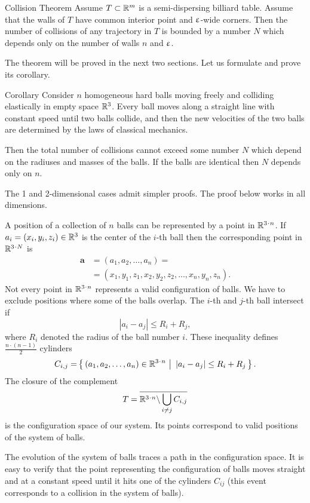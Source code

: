 \begin{thm}{Collision Theorem}\label{thm:collision}
Assume $T\subset\RR^m$
is a semi-dispersing billiard table.
Assume that the walls of $T$ have common interior point and $\upvarepsilon$-wide corners.
Then the number of collisions of any trajectory in  $T$  is bounded
by a number $N$ which depends only on the number of walls $n$ and $\upvarepsilon$.
\end{thm}


The theorem will be proved in the next two sections.
Let us formulate and prove its corollary.

\begin{thm}{Corollary}\label{cor:balls}
Consider $n$ homogeneous hard balls
moving freely and colliding
elastically in empty space $\mathbb{R}^3$. 
Every ball moves
along a straight line with constant speed until two balls collide, and then
the new velocities of the two balls are determined by the
laws of classical mechanics.

Then the total number of collisions cannot exceed some number $N$ which depend on the radiuses and masses of the balls.
If the balls are identical then $N$ depends only on $n$.
\end{thm}

The 1 and 2-dimensional cases admit simpler proofs.
The proof below works in all dimensions.



A position of a collection of $n$ balls can be represented by a point in $\RR^{3\cdot n}$.
If $a_i=(x_i,y_i,z_i) \in \RR^3$ is the center of the $i$-th ball
then
the corresponding point in $\RR^{3\cdot N}$ is
\begin{align*}
\bm{a}&=(a_1, a_2 , \dots , a_n ) =
\\
&=(x_1, y_1 , z_1 , x_2 , y_2 , z_2 , \dots , x_n , y_n , z_n).
\end{align*}
Not every point in $\RR^{3\cdot n}$ represents a valid configuration of balls. 
We have to exclude positions where some of the balls overlap. 
The $i$-th and $j$-th ball intersect if 
$$|a_i - a_j | \le R_i+R_j,$$
where $R_i$ denoted the radius of the ball number $i$.
These inequality defines $\tfrac{n\cdot(n-1)}{2}$ cylinders 
\[C_{i,j}=\set{(a_1, a_2 , \dots , a_n )\in\RR^{3\cdot n}} {|a_i - a_j | \le R_i+R_j}.\] 
The closure of the complement
\[T=\overline{\RR^{3\cdot n}\backslash \bigcup_{i\ne j} C_{i,j}}\] 
is the configuration space of our system. 
Its points correspond
to valid positions of the system of balls.

The evolution of the system
of balls traces a path in the configuration space. 
It is easy to verify that
the point representing the configuration of balls moves straight and at a
constant speed until it hits one of the cylinders $C_{ij}$ (this event corresponds
to a collision in the system of balls).

